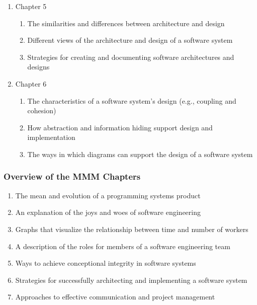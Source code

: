 \documentclass[11pt]{article}
\begin{document}
\begin{enumerate}
  \item Chapter 5

    \begin{enumerate}
      \itemsep 0in
      \item The similarities and differences between architecture and design
      \item Different views of the architecture and design of a software system
      \item Strategies for creating and documenting software architectures and designs
    \end{enumerate}

  \item Chapter 6

    \begin{enumerate}
      \itemsep 0in
      \item The characteristics of a software system's design (e.g., coupling
        and cohesion)
      \item How abstraction and information hiding support design and
        implementation
      \item The ways in which diagrams can support the design of a software
        system
    \end{enumerate}

\end{enumerate}

\vspace*{-1em}

\subsubsection*{Overview of the MMM Chapters}

\begin{enumerate}
  \item The mean and evolution of a programming systems product
  \item An explanation of the joys and woes of software engineering
  \item Graphs that visualize the relationship between time and number of
    workers
  \item A description of the roles for members of a software engineering team
  \item Ways to achieve conceptional integrity in software systems
  \item Strategies for successfully architecting and implementing a software
    system
  \item Approaches to effective communication and project management
\end{enumerate}
\end{document}
